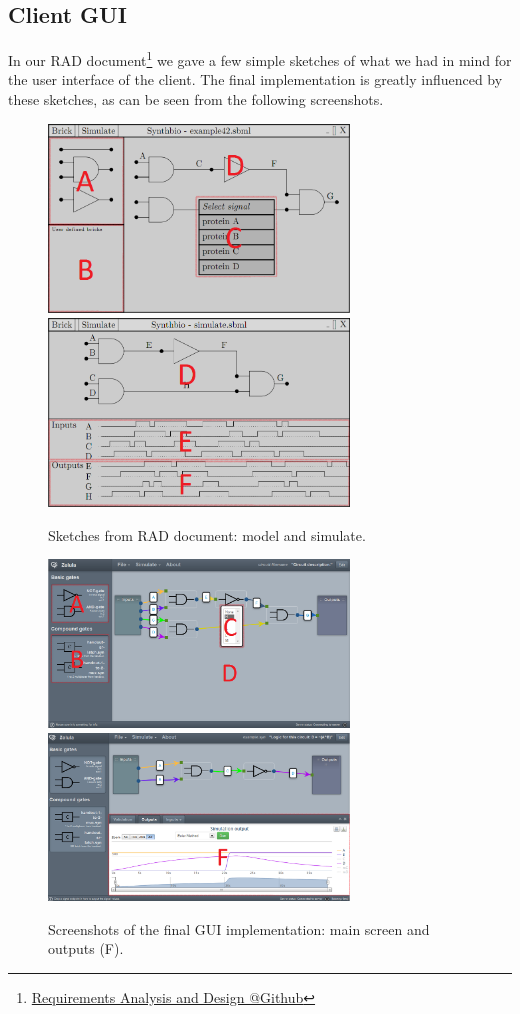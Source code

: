 \documentclass[a4paper]{article}
\makeatletter
\newcommand{\urlRAD}{https://github.com/FelixAkk/synthbio/raw/master/deliverables/rad/rad.pdf}
\newcommand{\hrefRAD}{\href{\urlRAD}{Requirements Analysis and Design @Github}}
\makeatother
\begin{document}
\subsection{Client GUI}
In our RAD document\footnote{\hrefRAD} we gave a few simple sketches of what we had in mind for the user interface of the client. The final implementation is greatly influenced by these sketches, as can be seen from the following screenshots.\\

\begin{figure}[h!]
\includegraphics[width=8cm]{pictures/gui_sketch1_marks.png} 
\includegraphics[width=8cm]{pictures/gui_sketch2_marks.png}
\caption{Sketches from RAD document: model and simulate.}
\label{fig-gui-proposed}
\end{figure}

\begin{figure}[h!]
\includegraphics[width=8cm]{pictures/gui_final1_marks.png} 
\includegraphics[width=8cm]{pictures/gui_final2_marks.png}
\caption{Screenshots of the final GUI implementation: main screen and outputs (F).}
\label{fig-gui-implemented}
\end{figure}
\end{document}
